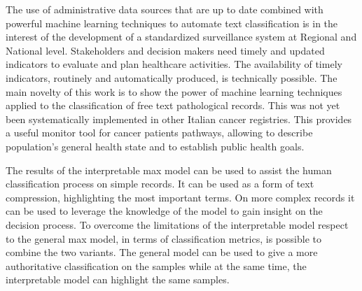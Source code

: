 The use of administrative data sources that are up to date combined
with powerful machine learning techniques to automate text
classification is in the interest of the development of a standardized
surveillance system at Regional and National level. Stakeholders and
decision makers need timely and updated indicators to evaluate and
plan healthcare activities. The availability of timely indicators,
routinely and automatically produced, is technically possible. The
main novelty of this work is to show the power of machine learning
techniques applied to the classification of free text pathological
records. This was not yet been systematically implemented in other
Italian cancer registries. This provides a useful monitor tool for
cancer patients pathways, allowing to describe population’s general
health state and to establish public health goals.

The results of the interpretable \ac{max} model can be used to
assist the human classification process on simple records. It can be
used as
a form of text compression, highlighting the most important terms. On
more complex records it can be used to leverage the knowledge of the
model to gain insight on the decision process. To overcome the
limitations of the interpretable
model respect to the general \ac{max} model, in terms of
classification metrics, is possible to combine the two variants. The
general model can be used to give a more
authoritative classification on the samples while at the same time,
the interpretable model can highlight the same samples.


